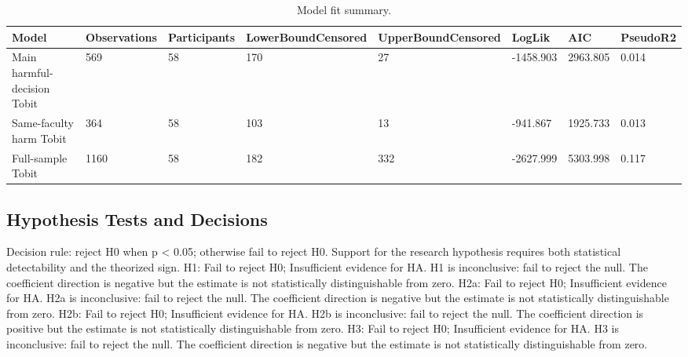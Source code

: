 \documentclass[11pt]{article}
\begin{document}
\begin{table}[H]
\centering
\caption{Model fit summary.}
\label{tab:model_fit}
\begin{tabular}{llllllll}
\toprule
Model & Observations & Participants & LowerBoundCensored & UpperBoundCensored & LogLik & AIC & PseudoR2 \\
\midrule
Main harmful-decision Tobit & 569 & 58 & 170 & 27 & -1458.903 & 2963.805 & 0.014 \\
Same-faculty harm Tobit & 364 & 58 & 103 & 13 & -941.867 & 1925.733 & 0.013 \\
Full-sample Tobit & 1160 & 58 & 182 & 332 & -2627.999 & 5303.998 & 0.117 \\
\bottomrule
\end{tabular}
\end{table}
\subsection{Hypothesis Tests and Decisions}
Decision rule: reject H0 when p < 0.05; otherwise fail to reject H0. Support for the research hypothesis requires both statistical detectability and the theorized sign.
H1: Fail to reject H0; Insufficient evidence for HA. H1 is inconclusive: fail to reject the null. The coefficient direction is negative but the estimate is not statistically distinguishable from zero. H2a: Fail to reject H0; Insufficient evidence for HA. H2a is inconclusive: fail to reject the null. The coefficient direction is negative but the estimate is not statistically distinguishable from zero. H2b: Fail to reject H0; Insufficient evidence for HA. H2b is inconclusive: fail to reject the null. The coefficient direction is positive but the estimate is not statistically distinguishable from zero. H3: Fail to reject H0; Insufficient evidence for HA. H3 is inconclusive: fail to reject the null. The coefficient direction is negative but the estimate is not statistically distinguishable from zero.
\end{document}
